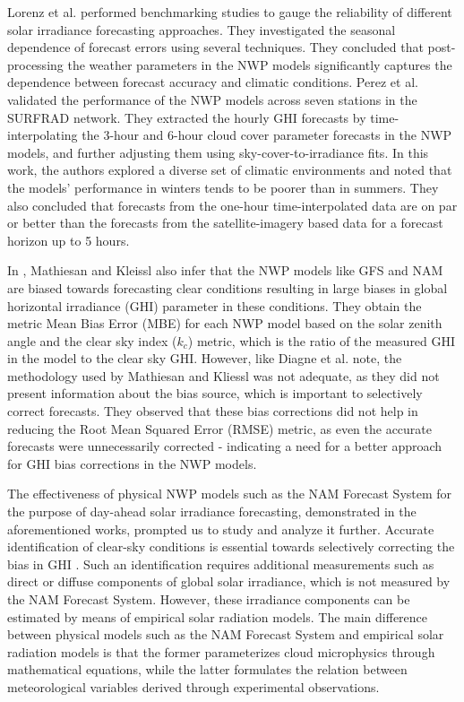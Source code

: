 \par Lorenz et al. \cite{litrev_nwp3} performed benchmarking studies to gauge the reliability of different solar irradiance forecasting approaches. They investigated the seasonal dependence of forecast errors using several techniques. They concluded that post-processing the weather parameters in the NWP models significantly captures the dependence between forecast accuracy and climatic conditions. Perez et al. \cite{litrev_nwp4} validated the performance of the NWP models across seven stations in the SURFRAD network. They extracted the hourly GHI forecasts by time-interpolating the 3-hour and 6-hour cloud cover parameter forecasts in the NWP models, and further adjusting them using sky-cover-to-irradiance fits. In this work, the authors explored a diverse set of climatic environments and noted that the models' performance in winters tends to be poorer than in summers. They also concluded that forecasts from the one-hour time-interpolated data are on par or better than the forecasts from the satellite-imagery based data for a forecast horizon up to 5 hours.

\par In \cite{litrev_nwp1}, Mathiesan and Kleissl also infer that the NWP models like GFS and NAM are biased towards forecasting clear conditions resulting in large biases in global horizontal irradiance (GHI) parameter in these conditions. They obtain the metric Mean Bias Error (MBE) for each NWP model based on the solar zenith angle and the clear sky index ($k_c$) metric, which is the ratio of the measured GHI in the model to the clear sky GHI. However, like Diagne et al. \cite{litrev_nwp5} note, the methodology used by Mathiesan and Kliessl was not adequate, as they did not present information about the bias source, which is important to selectively correct forecasts. They observed that these bias corrections did not help in reducing the Root Mean Squared Error (RMSE) metric, as even the accurate forecasts were unnecessarily corrected - indicating a need for a better approach for GHI bias corrections in the NWP models.

\par The effectiveness of physical NWP models such as the NAM Forecast System for the purpose of day-ahead solar irradiance forecasting, demonstrated in the aforementioned works, prompted us to study and analyze it further. Accurate identification of clear-sky conditions is essential towards selectively correcting the bias in GHI \cite{litrev_nwp6}. Such an identification requires additional measurements such as direct or diffuse components of global solar irradiance, which is not measured by the NAM Forecast System. However, these irradiance components can be estimated by means of empirical solar radiation models. The main difference between physical models such as the NAM Forecast System and empirical solar radiation models is that the former parameterizes cloud microphysics through mathematical equations, while the latter formulates the relation between meteorological variables derived through experimental observations. 

